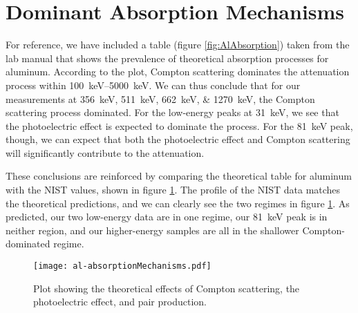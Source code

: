 \documentclass[letter]{article}
\begin{document}
\section{Dominant Absorption Mechanisms}

For reference, we have included a table (figure \ref{fig:AlAbsorption}) taken from the lab manual that shows the prevalence of theoretical absorption processes for aluminum. According to the plot, Compton scattering dominates the attenuation process within \qtyrange{100}{5000}{\kilo\electronvolt}. We can thus conclude that for our measurements at \qtylist{356;511;662;1270}{\kilo\electronvolt}, the Compton scattering process dominated. For the low-energy peaks at \qty{31}{\kilo\electronvolt}, we see that the photoelectric effect is expected to dominate the process. For the \qty{81}{\kilo\electronvolt} peak, though, we can expect that both the photoelectric effect and Compton scattering will significantly contribute to the attenuation. 

These conclusions are reinforced by comparing the theoretical table for aluminum with the NIST values, shown in figure \ref{fig:AttenComp}. The profile of the NIST data matches the theoretical predictions, and we can clearly see the two regimes in figure \ref{fig:AttenComp}. As predicted, our two low-energy data are in one regime, our \qty{81}{\kilo\electronvolt} peak is in neither region, and our higher-energy samples are all in the shallower Compton-dominated regime.


\begin{figure}[p] \centering
    \texttt{[image: al-absorptionMechanisms.pdf]}
    \caption{Plot showing the theoretical effects of Compton scattering, the photoelectric effect, and pair production.}
    \label{fig:AttenComp}
\end{figure}
\end{document}
